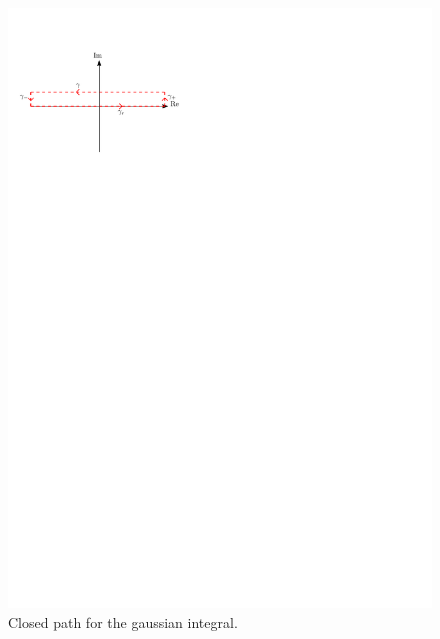 \documentclass[../template.tex]{subfiles}
\begin{document}
\begin{figure}[H]
    \centering
    \includegraphics{Images/residue_int2.pdf}
    \caption{Closed path for the gaussian integral.\label{fig:residue2}}
\end{figure}
\end{document}
